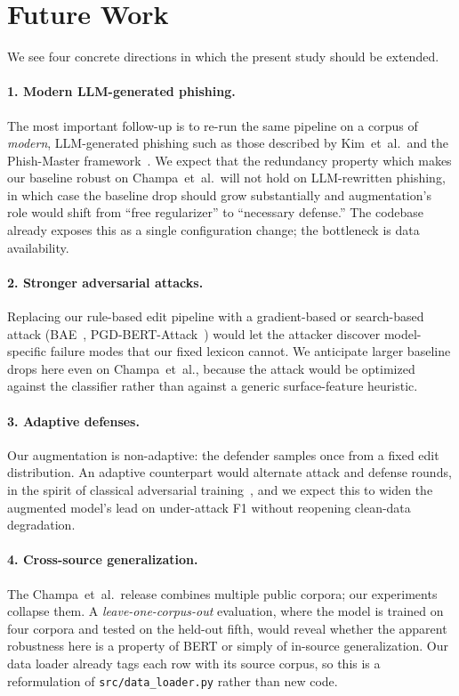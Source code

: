 \documentclass[conference]{IEEEtran}
\begin{document}
\section{Future Work}
\label{sec:future}

We see four concrete directions in which the present study should be
extended.

\paragraph{1. Modern LLM-generated phishing.} The most important
follow-up is to re-run the same pipeline on a corpus of \emph{modern},
LLM-generated phishing such as those described by Kim~et~al.\ and the
Phish-Master framework~\cite{kim2025llms,phishmaster2025}. We expect that
the redundancy property which makes our baseline robust on Champa~et~al.\
will not hold on LLM-rewritten phishing, in which case the baseline drop
should grow substantially and augmentation's role would shift from
``free regularizer'' to ``necessary defense.'' The codebase already
exposes this as a single configuration change; the bottleneck is data
availability.

\paragraph{2. Stronger adversarial attacks.} Replacing our rule-based
edit pipeline with a gradient-based or search-based attack
(BAE~\cite{textattack2020}, PGD-BERT-Attack~\cite{pgdbertattack2024})
would let the attacker discover model-specific failure modes that our
fixed lexicon cannot. We anticipate larger baseline drops here even on
Champa~et~al., because the attack would be optimized against the
classifier rather than against a generic surface-feature heuristic.

\paragraph{3. Adaptive defenses.} Our augmentation is non-adaptive: the
defender samples once from a fixed edit distribution. An adaptive
counterpart would alternate attack and defense rounds, in the spirit of
classical adversarial training~\cite{explainabletransformer2025}, and we
expect this to widen the augmented model's lead on under-attack F1
without reopening clean-data degradation.

\paragraph{4. Cross-source generalization.} The Champa~et~al.\ release
combines multiple public corpora; our experiments collapse them. A
\emph{leave-one-corpus-out} evaluation, where the model is trained on
four corpora and tested on the held-out fifth, would reveal whether
the apparent robustness here is a property of BERT or simply of in-source
generalization. Our data loader already tags each row with its source
corpus, so this is a reformulation of \texttt{src/data\_loader.py} rather
than new code.
\end{document}
